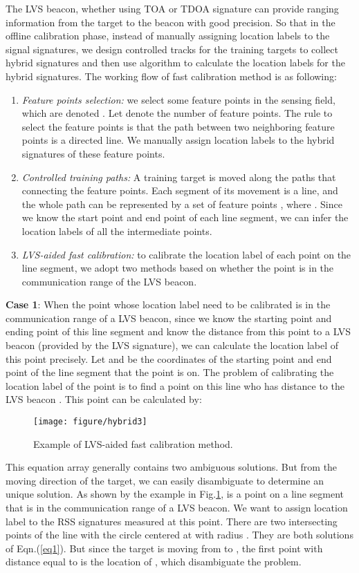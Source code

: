\documentclass[conference, 10pt]{IEEEtran}
\begin{document}
The LVS beacon, whether using TOA or TDOA signature can provide ranging information from the target to the beacon with good precision. So that in the offline calibration phase, instead of manually assigning location labels to the signal signatures, we design controlled tracks for the training targets to collect hybrid signatures and then use algorithm to calculate the location labels for the hybrid signatures.  The working flow of fast calibration method is as following:
 \begin{enumerate}
\item \emph{Feature points selection:} we select some feature points in the sensing field, which are denoted . Let  denote the number of feature points. The rule to select the feature points is that the path between two neighboring feature points is a directed line. We manually assign location labels to the hybrid signatures of these feature points.    
\item \emph{Controlled training paths:} A training target is moved along the paths that connecting the feature points. Each segment of its movement is a line, and the whole path can be represented by a set of feature points , where . Since we know the start point and end point of each line segment, we can infer the location labels of all the intermediate points.  
\item \emph{LVS-aided fast calibration: } to calibrate the location label of each point on the line segment, we adopt two methods based on whether the point is in the communication range of the LVS beacon.  
\end{enumerate}

\textbf{Case 1}: When the point whose location label need to be calibrated is in the communication range of a LVS beacon, since we know the starting point and ending point of this line segment and know the distance from this point to a LVS beacon (provided by the LVS signature), we can calculate the location label of this point precisely.  Let  and  be the coordinates of the starting point and end point of the line segment that the point is on. The problem of calibrating the location label of the point is to find a point on this line who has distance  to the LVS beacon . This point can be calculated by:


\begin{figure}[htbp]
\begin{center}
\texttt{[image: figure/hybrid3]}
\caption{Example of LVS-aided fast calibration method.}
\label{fig3}
\end{center}
\end{figure}
This equation array generally contains two ambiguous solutions. But from the moving direction of the target, we can easily disambiguate to determine an unique solution. As shown by the example in Fig.\ref{fig3},  is a point on a line segment that is in the communication range of a LVS beacon. We want to assign location label to the RSS signatures measured at this point. There are two intersecting points of  the line with the circle centered at  with radius . They are both solutions of Eqn.(\ref{eq1}). But since the target is moving from  to , the first point with distance equal to  is the location of , which disambiguate the problem. 
\end{document}
